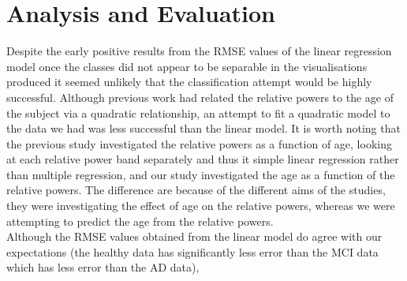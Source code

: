 \chapter{Analysis and Evaluation}

Despite the early positive results from the RMSE values of the linear regression model once the classes did not appear to be separable in the visualisations produced it seemed unlikely that the classification attempt would be highly successful. Although previous work \cite{Gomez2013} had related the relative powers to the age of the subject via a quadratic relationship, an attempt to fit a quadratic model to the data we had was less successful than the linear model. It is worth noting that the previous study investigated the relative powers as a function of age, looking at each relative power band separately and thus it simple linear regression rather than multiple regression, and our study investigated the age as a function of the relative powers. The difference are because of the different aims of the studies, they were investigating the effect of age on the relative powers, whereas we were attempting to predict the age from the relative powers.\\

Although the RMSE values obtained from the linear model do agree with our expectations (the healthy data has significantly less error than the MCI data which has less error than the AD data), 